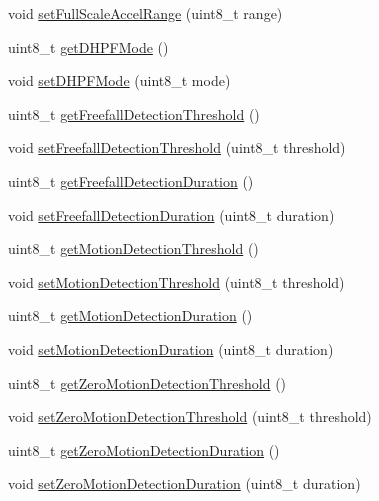 \begin{DoxyCompactItemize}
\item 
void \mbox{\hyperlink{classMPU6050_a64eb78e8e359c541beaf8664db3421d1}{set\+Full\+Scale\+Accel\+Range}} (uint8\+\_\+t range)
\item 
uint8\+\_\+t \mbox{\hyperlink{classMPU6050_a4c3b84a906fcb5a65870fa557f797f4a}{get\+D\+H\+P\+F\+Mode}} ()
\item 
void \mbox{\hyperlink{classMPU6050_a44cc43aaad1e52c1ba3142d4490af611}{set\+D\+H\+P\+F\+Mode}} (uint8\+\_\+t mode)
\item 
uint8\+\_\+t \mbox{\hyperlink{classMPU6050_ac7f5c0511fe9d0f3525a3757498daed7}{get\+Freefall\+Detection\+Threshold}} ()
\item 
void \mbox{\hyperlink{classMPU6050_af704e1a4eb01522b146abeba78c32716}{set\+Freefall\+Detection\+Threshold}} (uint8\+\_\+t threshold)
\item 
uint8\+\_\+t \mbox{\hyperlink{classMPU6050_a3cff6b9613ad01aa1a51c287f5c5e329}{get\+Freefall\+Detection\+Duration}} ()
\item 
void \mbox{\hyperlink{classMPU6050_a41eeb40a654465966d260e3d31c4de4b}{set\+Freefall\+Detection\+Duration}} (uint8\+\_\+t duration)
\item 
uint8\+\_\+t \mbox{\hyperlink{classMPU6050_ab7a825b1b8b86cebda308289630795e7}{get\+Motion\+Detection\+Threshold}} ()
\item 
void \mbox{\hyperlink{classMPU6050_aa23c8d66502345c30915e69975fd2cc9}{set\+Motion\+Detection\+Threshold}} (uint8\+\_\+t threshold)
\item 
uint8\+\_\+t \mbox{\hyperlink{classMPU6050_a8ba035c2ae4a05d7e51b0d29e4924fb0}{get\+Motion\+Detection\+Duration}} ()
\item 
void \mbox{\hyperlink{classMPU6050_a6d81616aaa47539217057891c91ff08f}{set\+Motion\+Detection\+Duration}} (uint8\+\_\+t duration)
\item 
uint8\+\_\+t \mbox{\hyperlink{classMPU6050_ad941c1e844dc9230675c115734599ea3}{get\+Zero\+Motion\+Detection\+Threshold}} ()
\item 
void \mbox{\hyperlink{classMPU6050_a347a51fd25de20b9ead4659015ef793b}{set\+Zero\+Motion\+Detection\+Threshold}} (uint8\+\_\+t threshold)
\item 
uint8\+\_\+t \mbox{\hyperlink{classMPU6050_a04c0fcdcd0157b6dbf74d4901424801e}{get\+Zero\+Motion\+Detection\+Duration}} ()
\item 
void \mbox{\hyperlink{classMPU6050_a6d25a21e1673682f096399b719c66d2c}{set\+Zero\+Motion\+Detection\+Duration}} (uint8\+\_\+t duration)
\item 

\end{DoxyCompactItemize}
